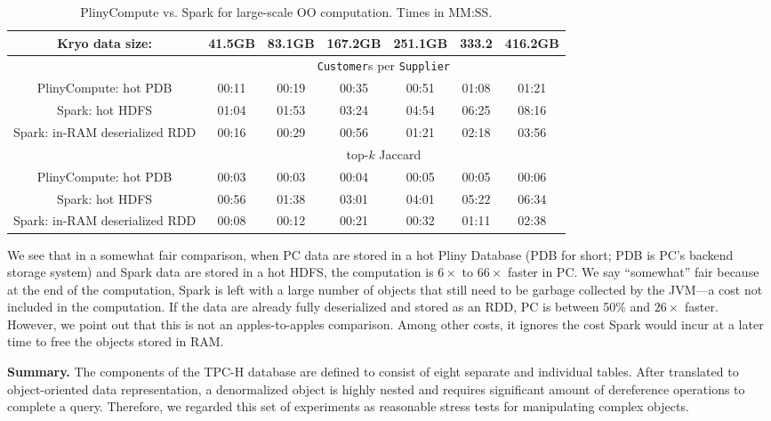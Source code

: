 \begin{table}[h!]
\begin{center}
\begin{tabular}{|c||c|c|c|c|c|c|}
\hline
Kryo data size: &41.5GB & 83.1GB & 167.2GB &251.1GB &333.2 &416.2GB \\
\hline
& \multicolumn{6}{c|}{\texttt{Customer}s per \texttt{Supplier}} \\
\hline
PlinyCompute: hot PDB & 00:11&	00:19&	00:35&	00:51&	01:08&	01:21 \\
Spark: hot HDFS & 01:04&	01:53&	03:24&	04:54&	06:25&	08:16\\
Spark: in-RAM deserialized RDD & 00:16& 	00:29& 	00:56& 	01:21& 	02:18& 	03:56\\
\hline
& \multicolumn{6}{c|}{top-$k$ Jaccard} \\
\hline
PlinyCompute: hot PDB & 00:03&	00:03&	00:04&	00:05&	00:05&	00:06 \\
Spark: hot HDFS & 00:56&	01:38&	03:01 & 04:01&	05:22&	06:34\\
Spark: in-RAM deserialized RDD & 00:08& 	00:12& 	00:21 & 00:32& 	01:11& 	02:38\\
\hline
\end{tabular}
\caption{PlinyCompute vs. Spark for large-scale OO computation. Times in MM:SS.}
\label{fig:TPC}
\end{center}
\end{table}
\vspace{-10pt}
We see that in a somewhat fair comparison, when PC data are
stored in a hot Pliny Database (PDB for short; PDB is PC's backend storage system) and Spark data
are stored in
a hot HDFS, the computation is $6\times$ to $66\times$ faster in PC.  We say ``somewhat'' fair
because at the end of the computation, Spark is left with a large number of objects that still need to be 
garbage collected by the JVM---a cost not included in the computation. If the data are already
fully deserialized and stored as an RDD, PC is 
between 50\% and $26\times$ faster.  However, we point out that this is not an apples-to-apples comparison.
Among other costs, it ignores
the cost Spark would incur at a later time to free the objects stored
in RAM.

\vspace{5pt}
\noindent
\textbf{Summary.} The components of the TPC-H database are defined to
consist of eight separate and individual tables. After translated to
object-oriented data representation, a denormalized object is highly
nested and requires significant amount of dereference
operations to complete a query. Therefore, we regarded this set of
experiments as reasonable stress
tests for manipulating complex objects. 

